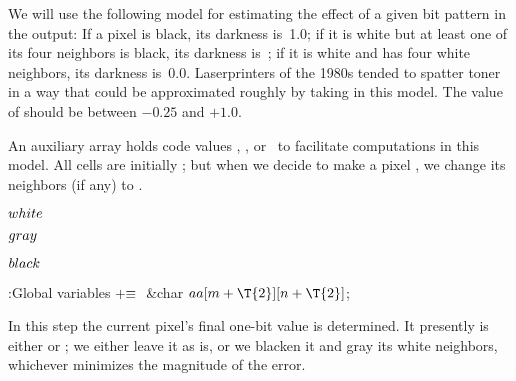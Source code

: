 We will use the following model for estimating the effect of a given
bit pattern in the output: If a pixel is black, its darkness is~1.0;
if it is white but at least one of its four neighbors is black, its
darkness is~; if it is white and has four white neighbors, its
darkness is~0.0. Laserprinters of the 1980s tended to spatter toner
in a way that could be approximated roughly by taking 
in
this model. The value of  should be between $-0.25$ and $+1.0$.

An auxiliary array  holds code values
, , or~ to facilitate computations in
this model.
All cells are initially ; but when we decide to make a pixel
, we change its  neighbors (if any) to .

\Y\B\4\D$\\{white}$ \5
\par
\B\4\D$\\{gray}$ \5
\par
\B\4\D$\\{black}$ \5
\par
\Y\B\4:Global variables\X${}\mathrel+\equiv{}$\6
\&{char} ${}\\{aa}[\|m+\T{2}][\|n+\T{2}]{}$;\par
\fi

In this step the current pixel's final one-bit value is determined.
It presently is either  or ; we either leave it as
is,
or we blacken it and gray its white neighbors, whichever minimizes the
magnitude of the error.

